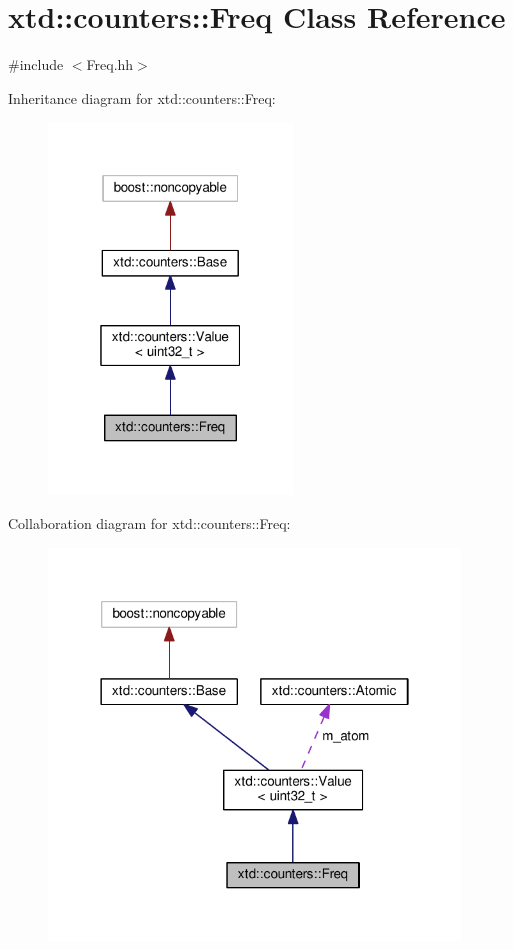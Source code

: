 \hypertarget{classxtd_1_1counters_1_1Freq}{\section{xtd\-:\-:counters\-:\-:Freq Class Reference}
\label{classxtd_1_1counters_1_1Freq}
}


{\ttfamily \#include $<$Freq.\-hh$>$}



Inheritance diagram for xtd\-:\-:counters\-:\-:Freq\-:
\nopagebreak
\begin{figure}[H]
\begin{center}
\leavevmode
\includegraphics[width=184pt]{classxtd_1_1counters_1_1Freq__inherit__graph}
\end{center}
\end{figure}


Collaboration diagram for xtd\-:\-:counters\-:\-:Freq\-:
\nopagebreak
\begin{figure}[H]
\begin{center}
\leavevmode
\includegraphics[width=310pt]{classxtd_1_1counters_1_1Freq__coll__graph}
\end{center}
\end{figure}

